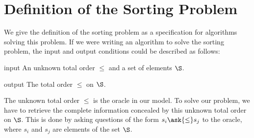 \section{Definition of the Sorting Problem}
\label{tree:sorting:def}

We give the definition of the sorting problem as a specification for algorithms
solving this problem.
If we were writing an algorithm to solve the sorting problem, the input and output
conditions could be described as follows:
\begin{problem}[Sorting]\mbox{}
\begin{algorithm}
\item[input] An unknown total order \(\le\) and a set of elements \(\S\).
\item[output] The total order \(\le\) on \(\S\).
\end{algorithm}
\end{problem}

The unknown total order \(\le\) is the oracle in our model. To solve our
problem, we have to retrieve the complete information concealed by this
unknown total order on \(\S\). This is done by asking questions of the
form \(s_i \ask{\le} s_j\) to the oracle, where \(s_i\) and \(s_j\) are
elements of the set \(\S\).

